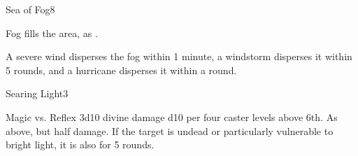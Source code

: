 \begin{spellsection}{Sea of Fog}{8}
\begin{spellheader}
    \begin{spelltargetinginfo}
    \end{spelltargetinginfo}
\end{spellheader}
\begin{spellcontent}
    \begin{spelleffects}
        \spelleffect Fog fills the area, as .
    \end{spelleffects}
\end{spellcontent}
\begin{spellfooter}
    \spellnotes \fogspellnotes A severe wind disperses the fog within 1 minute, a windstorm disperses it within 5 rounds, and a hurricane disperses it within a round.

    \physicalspellnotes
\end{spellfooter}
\end{spellsection}

\begin{spellsection}{Searing Light}{3}
\begin{spellheader}
    \begin{spelltargetinginfo}
    \end{spelltargetinginfo}
\end{spellheader}
\begin{spellcontent}
    \begin{spelleffects}
        \begin{spellattack}{Magic vs. Reflex}
            \spellsuccess 3d10 divine damage \add d10 per four caster levels above 6th.
            \spellfailure As above, but half damage.
            \spelleffect If the target is undead or particularly vulnerable to bright light, it is also \dazzled for 5 rounds.
        \end{spellattack}
    \end{spelleffects}
\end{spellcontent}
\begin{spellfooter}
\end{spellfooter}
\end{spellsection}

